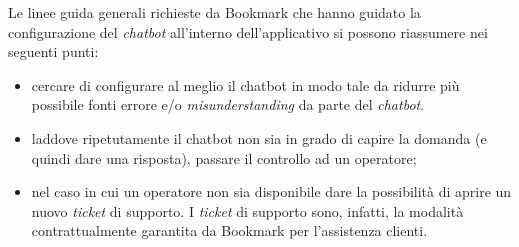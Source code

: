 Le linee guida generali richieste da Bookmark che hanno guidato la configurazione del \textit{chatbot} all'interno dell'applicativo si possono riassumere nei seguenti punti:
\begin{itemize}
    \item cercare di configurare al meglio il chatbot in modo tale da ridurre più possibile fonti errore e/o \textit{misunderstanding} da parte del \textit{chatbot}.
    \item laddove ripetutamente il chatbot non sia in grado di capire la domanda (e quindi dare una risposta), passare il controllo ad un operatore;
    \item nel caso in cui un operatore non sia disponibile dare la possibilità di aprire un nuovo \textit{ticket} di supporto. I \textit{ticket} di supporto sono, infatti, la modalità contrattualmente garantita da Bookmark per l'assistenza clienti.
\end{itemize}

